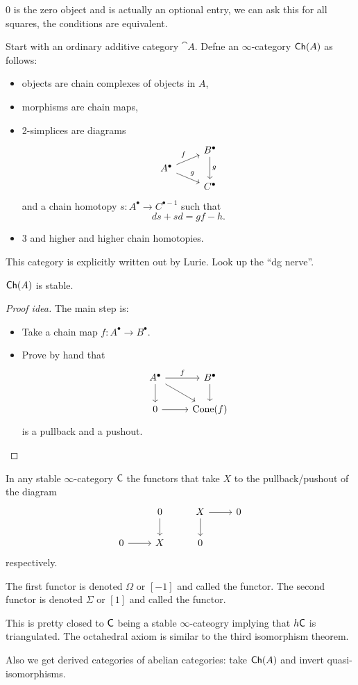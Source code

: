 \begin{remark}
	0 is the zero object and is actually an optional entry, we can ask this for all squares,
	the conditions are equivalent.
\end{remark}
\begin{example}
	Start with an ordinary additive category $\cat{A}$. Defne an $\infty$-category $\mathsf{Ch}(A)$ as follows:
	\begin{itemize}
		\item objects are chain complexes of objects in $A$,
		\item morphisms are chain maps,
		\item 2-simplices are diagrams
			\[
				\begin{tikzcd}[row sep=tiny]
					& B^{\bullet} \ar[dd,"g"] \\
					A^{\bullet} \ar[ur,"f"] \ar[dr,"g"] \\
					& C^{\bullet}
				\end{tikzcd}
			\]
			and a chain homotopy $s:A^{\bullet}\to C^{\bullet-1}$ such that
			\[
				ds + sd = gf-h.
			\]
		\item 3 and higher and higher chain homotopies.
	\end{itemize}
\end{example}
This category is explicitly written out by Lurie. Look up the ``dg nerve''.
\begin{lemma}
	$\mathsf{Ch}(A)$ is stable.
\end{lemma}
\begin{proof}[Proof idea]
	The main step is:
	\begin{itemize}
		\item Take a chain map $f:A^{\bullet}\to B^{\bullet}$.
		\item Prove by hand that
			\[
				\begin{tikzcd}
					A^{\bullet} \ar[r,"f"] \ar[d] \ar[dr] & B^{\bullet} \ar[d] \\
					0 \ar[r] & \Cone(f)
				\end{tikzcd}
			\]
			is a pullback and a pushout.
	\end{itemize}	
\end{proof}
\begin{lemma}
	In any stable $\infty$-category $\mathsf{C}$ the functors that take $X$ to the pullback/pushout
	of the diagram
	\[
		\begin{tikzcd}
			& 0 \ar[d] & X \ar[r] \ar[d] & 0 \\
			0 \ar[r] & X & 0
		\end{tikzcd}
	\]
	respectively.
\end{lemma}
The first functor is denoted $\Omega$ or $[-1]$ and called the  functor.
The second functor is denoted $\Sigma$ or $[1]$ and called the  functor.
\begin{remark}
	This is pretty closed to $\mathsf{C}$ being a stable $\infty$-cateogry implying that $h\mathsf{C}$ is
	triangulated. The octahedral axiom is similar to the third isomorphism theorem.
\end{remark}
Also we get derived categories of abelian categories: take $\mathsf{Ch}(A)$ and invert quasi-isomorphisms.

